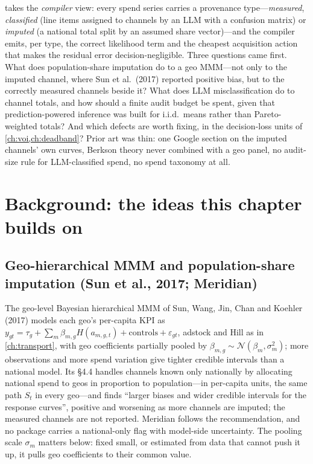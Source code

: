  takes the \emph{compiler} view: every spend series carries a provenance type---\emph{measured}, \emph{classified} (line items assigned to channels by an LLM with a confusion matrix) or \emph{imputed} (a national total split by an assumed share vector)---and the compiler emits, per type, the correct likelihood term and the cheapest acquisition action that makes the residual error decision-negligible. Three questions came first. What does population-share imputation do to a geo MMM---not only to the imputed channel, where Sun et al.\ (2017) reported positive bias, but to the correctly measured channels beside it? What does LLM misclassification do to channel totals, and how should a finite audit budget be spent, given that prediction-powered inference was built for i.i.d.\ means rather than Pareto-weighted totals? And which defects are worth fixing, in the decision-loss units of \cref{ch:voi,ch:deadband}? Prior art was thin: one Google section on the imputed channels' own curves, Berkson theory never combined with a geo panel, no audit-size rule for LLM-classified spend, no spend taxonomy at all.

\section{Background: the ideas this chapter builds on}

\subsection{Geo-hierarchical MMM and population-share imputation (Sun et al., 2017; Meridian)}

The geo-level Bayesian hierarchical MMM of Sun, Wang, Jin, Chan and Koehler (2017) models each geo's per-capita KPI as $y_{gt} = \tau_g + \sum_m \beta_{m,g}H(a_{m,g,t}) + \text{controls} + \varepsilon_{gt}$, adstock and Hill as in \cref{ch:transport}, with geo coefficients partially pooled by $\beta_{m,g} \sim \mathcal N(\beta_m, \sigma_m^2)$; more observations and more spend variation give tighter credible intervals than a national model. Its \S4.4 handles channels known only nationally by allocating national spend to geos in proportion to population---in per-capita units, the same path $S_t$ in every geo---and finds ``larger biases and wider credible intervals for the response curves'', positive and worsening as more channels are imputed; the measured channels are not reported. Meridian follows the recommendation, and no package carries a national-only flag with model-side uncertainty. The pooling scale $\sigma_m$ matters below: fixed small, or estimated from data that cannot push it up, it pulls geo coefficients to their common value.

